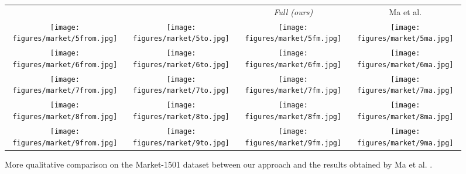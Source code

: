 \documentclass[10pt,twocolumn,letterpaper]{article}
\begin{document}
\begin{figure*}[h]
  \centering
  \setlength\tabcolsep{1.0pt}
\begin{tabular}{cccc}
 &   & \small\emph{Full (ours)}& Ma et al. \cite{ma2017pose}\\ 
\texttt{[image: figures/market/5from.jpg]}
&\texttt{[image: figures/market/5to.jpg]}
&\texttt{[image: figures/market/5fm.jpg]}
&\texttt{[image: figures/market/5ma.jpg]}
\\
\texttt{[image: figures/market/6from.jpg]}
&\texttt{[image: figures/market/6to.jpg]}
&\texttt{[image: figures/market/6fm.jpg]}
&\texttt{[image: figures/market/6ma.jpg]}
\\
\texttt{[image: figures/market/7from.jpg]}
&\texttt{[image: figures/market/7to.jpg]}
&\texttt{[image: figures/market/7fm.jpg]}
&\texttt{[image: figures/market/7ma.jpg]}
\\
\texttt{[image: figures/market/8from.jpg]}
&\texttt{[image: figures/market/8to.jpg]}
&\texttt{[image: figures/market/8fm.jpg]}
&\texttt{[image: figures/market/8ma.jpg]}
\\
\texttt{[image: figures/market/9from.jpg]}
&\texttt{[image: figures/market/9to.jpg]}
&\texttt{[image: figures/market/9fm.jpg]}
&\texttt{[image: figures/market/9ma.jpg]}
\end{tabular}
  \caption{More qualitative comparison on the Market-1501 dataset between our approach and the results obtained by Ma et al. \cite{ma2017pose}.}
\label{fig:comparison-Market-2}
\end{figure*}
\end{document}
